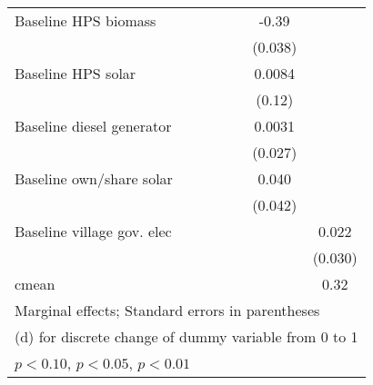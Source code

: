 \begin{table}[htbp]
\begin{tabular*}{1\hsize}{@{\hskip\tabcolsep\extracolsep\fill}l*{6}{c}}
Baseline HPS biomass&                  &                  &                  &                  &    -0.39\sym{***}&                  \\
                &                  &                  &                  &                  &  (0.038)         &                  \\
Baseline HPS solar&                  &                  &                  &                  &   0.0084         &                  \\
                &                  &                  &                  &                  &   (0.12)         &                  \\
Baseline diesel generator&                  &                  &                  &                  &   0.0031         &                  \\
                &                  &                  &                  &                  &  (0.027)         &                  \\
Baseline own/share solar&                  &                  &                  &                  &    0.040         &                  \\
                &                  &                  &                  &                  &  (0.042)         &                  \\
Baseline village gov. elec&                  &                  &                  &                  &                  &    0.022         \\
                &                  &                  &                  &                  &                  &  (0.030)         \\
\midrule
cmean           &                  &                  &                  &                  &                  &     0.32         \\
\bottomrule
\multicolumn{7}{l}{\footnotesize Marginal effects; Standard errors in parentheses}\\
\multicolumn{7}{l}{\footnotesize  (d) for discrete change of dummy variable from 0 to 1}\\
\multicolumn{7}{l}{\footnotesize \sym{*} \(p<0.10\), \sym{**} \(p<0.05\), \sym{***} \(p<0.01\)}\\
\end{tabular*}
\end{table}
